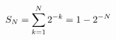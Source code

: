 \documentclass[preview]{standalone}
\begin{document}
\begin{align*}
\special{dvisvgm:raw <g id='unique000'>}S_N=\sum_{k=1}^{N}2^{-k}=1-2^{-N}\special{dvisvgm:raw </g>}
\end{align*}
\end{document}
